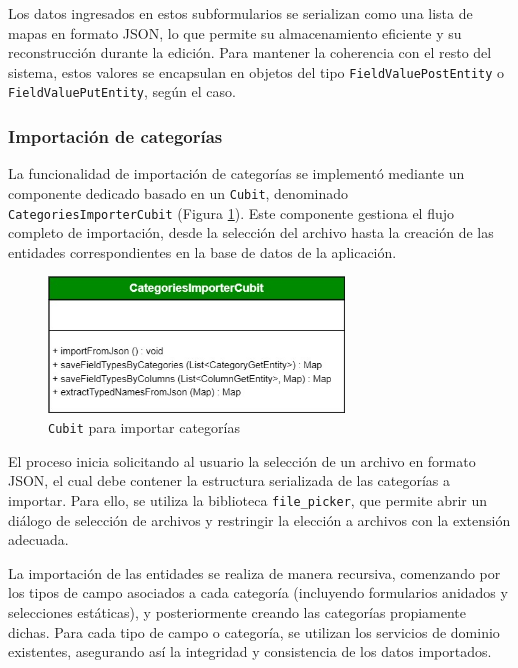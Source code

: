 \documentclass{article}
\begin{document}
Los datos ingresados en estos subformularios se serializan como una lista de mapas en formato JSON, lo que permite su almacenamiento eficiente y su reconstrucción durante la edición. Para mantener la coherencia con el resto del sistema, estos valores se encapsulan en objetos del tipo \texttt{FieldValuePostEntity} o \texttt{FieldValuePutEntity}, según el caso.


\subsubsection{Importación de categorías}

La funcionalidad de importación de categorías se implementó mediante un componente dedicado basado en un \texttt{Cubit}, denominado \texttt{CategoriesImporterCubit} (Figura \ref{fig:categoryimporter}). Este componente gestiona el flujo completo de importación, desde la selección del archivo hasta la creación de las entidades correspondientes en la base de datos de la aplicación.

\begin{figure}[H]
  \centering
  \includegraphics[width=0.7\textwidth]{images/category_importer.jpg}
  \caption{\texttt{Cubit} para importar categorías}
  \label{fig:categoryimporter}
\end{figure}

El proceso inicia solicitando al usuario la selección de un archivo en formato JSON, el cual debe contener la estructura serializada de las categorías a importar. Para ello, se utiliza la biblioteca \texttt{file\_picker}, que permite abrir un diálogo de selección de archivos y restringir la elección a archivos con la extensión adecuada.

La importación de las entidades se realiza de manera recursiva, comenzando por los tipos de campo asociados a cada categoría (incluyendo formularios anidados y selecciones estáticas), y posteriormente creando las categorías propiamente dichas. Para cada tipo de campo o categoría, se utilizan los servicios de dominio existentes, asegurando así la integridad y consistencia de los datos importados.
\end{document}
